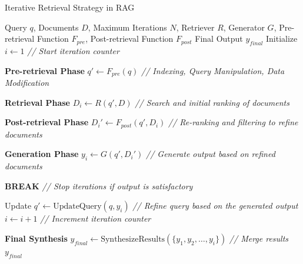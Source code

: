 \begin{algorithm}
	\caption{Iterative Retrieval Strategy in RAG}
	\label{alg:iterative_rag_workflow}
	\begin{algorithmic}[1]
		\REQUIRE Query $q$, Documents $D$, Maximum Iterations $N$, Retriever $R$, Generator $G$, Pre-retrieval Function $F_{pre}$, Post-retrieval Function $F_{post}$
		\ENSURE Final Output $y_{final}$
		\STATE Initialize $i \gets 1$ \hfill \textit{// Start iteration counter}
		
		\STATE \textbf{Pre-retrieval Phase}
		\STATE $q' \gets F_{pre}(q)$ \hfill \textit{// Indexing, Query Manipulation, Data Modification}
		
		\STATE \textbf{Retrieval Phase}
		\STATE $D_{i} \gets R(q', D)$ \hfill \textit{// Search and initial ranking of documents}
		
		\STATE \textbf{Post-retrieval Phase}
		\STATE $D_{i}' \gets F_{post}(q', D_{i})$ \hfill \textit{// Re-ranking and filtering to refine documents}
		
		\STATE \textbf{Generation Phase}
		\STATE $y_{i} \gets G(q', D_{i}')$ \hfill \textit{// Generate output based on refined documents}
		
		\STATE \textbf{BREAK} \hfill \textit{// Stop iterations if output is satisfactory}
		\ENDIF
		
		\STATE Update $q' \gets \text{UpdateQuery}(q, y_{i})$ \hfill \textit{// Refine query based on the generated output}
		\STATE $i \gets i + 1$ \hfill \textit{// Increment iteration counter}
		\ENDWHILE
		
		\STATE \textbf{Final Synthesis}
		\STATE $y_{final} \gets \text{SynthesizeResults}(\{y_{1}, y_{2}, \dots, y_{i}\})$ \hfill \textit{// Merge results}
		\RETURN $y_{final}$
		
	\end{algorithmic}
\end{algorithm}

